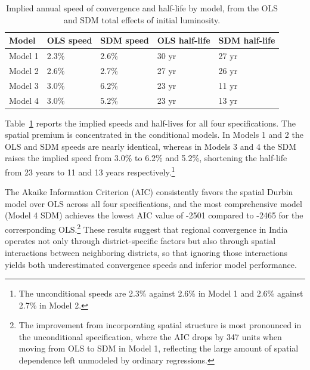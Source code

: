 \documentclass[
  letterpaper,
  DIV=11,
  numbers=noendperiod]{scrartcl}
\begin{document}
\begin{longtable}[]{@{}lllll@{}}

\caption{\label{tbl-speed}Implied annual speed of convergence and
half-life by model, from the OLS and SDM total effects of initial
luminosity.}

\tabularnewline

\toprule\noalign{}
Model & OLS speed & SDM speed & OLS half-life & SDM half-life \\
\midrule\noalign{}
\endhead
\bottomrule\noalign{}
\endlastfoot
Model 1 & 2.3\% & 2.6\% & 30 yr & 27 yr \\
Model 2 & 2.6\% & 2.7\% & 27 yr & 26 yr \\
Model 3 & 3.0\% & 6.2\% & 23 yr & 11 yr \\
Model 4 & 3.0\% & 5.2\% & 23 yr & 13 yr \\

\end{longtable}

Table~\ref{tbl-speed} reports the implied speeds and half-lives for all
four specifications. The spatial premium is concentrated in the
conditional models. In Models 1 and 2 the OLS and SDM speeds are nearly
identical, whereas in Models 3 and 4 the SDM raises the implied speed
from 3.0\% to 6.2\% and 5.2\%, shortening the half-life from 23 years to
11 and 13 years respectively.\footnote{The unconditional speeds are
  2.3\% against 2.6\% in Model 1 and 2.6\% against 2.7\% in Model 2.}

The Akaike Information Criterion (AIC) consistently favors the spatial
Durbin model over OLS across all four specifications, and the most
comprehensive model (Model 4 SDM) achieves the lowest AIC value of -2501
compared to -2465 for the corresponding OLS.\footnote{The improvement
  from incorporating spatial structure is most pronounced in the
  unconditional specification, where the AIC drops by 347 units when
  moving from OLS to SDM in Model 1, reflecting the large amount of
  spatial dependence left unmodeled by ordinary regressions.} These
results suggest that regional convergence in India operates not only
through district-specific factors but also through spatial interactions
between neighboring districts, so that ignoring those interactions
yields both underestimated convergence speeds and inferior model
performance.
\end{document}
